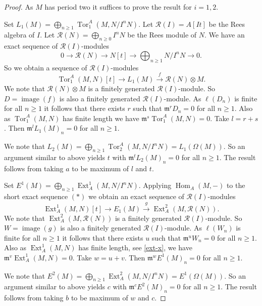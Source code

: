 \documentclass[10pt,a4paper]{amsart}
\newcommand{\Ext}{\operatorname{Ext}}
\newcommand{\Hom}{\operatorname{Hom}}
\newcommand{\R}{\mathcal{R} }
\newcommand{\Tor}{\operatorname{Tor}}
\newcommand{\image}{\operatorname{image}}
\newcommand{\m}{\mathfrak{m} }
\newcommand{\rt}{\rightarrow}
\begin{document}
\begin{proof}
As $M$ has period two it suffices to prove the result for $i = 1, 2$.

 Set $L_1(M) = \bigoplus_{n \geq 1}\Tor^A_1(M, N/I^{n}N)$. Let $\R(I) = A[It]$ be the Rees algebra of $I$.
Let $\R(N) = \bigoplus_{n \geq 0}I^nN$ be the Rees module of $N$. We have an exact sequence of $\R(I)$-modules
\begin{equation*}
 0 \rt \R(N) \rt N[t] \rt \bigoplus_{n \geq 1}N/I^nN \rt 0. \tag{*}
\end{equation*}
So we obtain a sequence of $\R(I)$-modules
\[
\Tor^A_1(M, N)[t] \rt L_1(M) \xrightarrow{f} \R(N)\otimes M.
\]
We note that $\R(N)\otimes M$ is a finitely generated $\R(I)$-module. So $D = \image(f)$ is also a finitely generated $\R(I)$-module. As $\ell(D_n)$ is finite for all $n \geq 1$ it follows that
there exists $r$ such that $\m^rD_n = 0$ for all $n \geq 1$. Also as $\Tor^A_1(M, N)$ has finite length we have $\m^s\Tor^A_1(M, N) = 0$. Take $l = r + s$. Then $\m^lL_1(M)_n = 0$ for all $n \geq 1$.

We note that $L_2(M) = \bigoplus_{n \geq 1}\Tor^A_2(M, N/I^{n}N) = L_1(\Omega(M))$. So an argument similar to above yields $t$ with $\m^tL_2(M)_n = 0$ for all $n \geq 1$. The result follows from taking $a$ to be maximum of $l$ and $t$.

Set $E^1(M) = \bigoplus_{n \geq 1}\Ext_A^1(M, N/I^{n}N)$. Applying $\Hom_A(M, -)$ to the short exact sequence $(*)$ we obtain an exact sequence of $\R(I)$-modules
\[
\Ext^1_A(M, N)[t] \rt E_1(M) \xrightarrow{g} \Ext^2_A(M, \R(N)).
\]
We note that  $\Ext^2_A(M, \R(N))$ is a finitely generated $\R(I)$-module. So $W = \image(g)$ is also a finitely generated $\R(I)$-module. As $\ell(W_n)$ is finite for all $n \geq 1$ it follows that
there exists $u$ such that $\m^uW_n = 0$ for all $n \geq 1$. Also as $\Ext^1_A(M, N)$ has finite length, see \ref{ext-x}, we have $\m^v\Ext_A^1(M, N) = 0$. Take $w = u + v$. Then $\m^wE^1(M)_n = 0$ for all $n \geq 1$.

We note that $E^2(M) = \bigoplus_{n \geq 1}\Ext^2_A(M, N/I^{n}N) = E^1(\Omega(M))$. So an argument similar to above yields $c$ with $\m^cE^2(M)_n = 0$ for all $n \geq 1$. The result follows from taking $b$ to be maximum of $w$ and $c$.
\end{proof}
\end{document}
